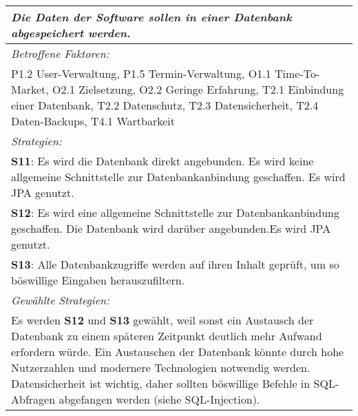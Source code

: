 {\begin{center}
\begin{minipage}{\linewidth}
\begin{tabular}{|>{\centering\arraybackslash}p{15cm}|}
            \label{K4}
            \textit{Die Daten der Software sollen in einer Datenbank abgespeichert werden.}\\ \hline
            \textit{Betroffene Faktoren:} \\ 
	P1.2 User-Verwaltung, P1.5 Termin-Verwaltung, O1.1 Time-To-Market, O2.1 Zielsetzung, O2.2 Geringe Erfahrung, T2.1 Einbindung einer Datenbank, T2.2 Datenschutz, T2.3 Datensicherheit, T2.4 Daten-Backups, T4.1 Wartbarkeit
	\\ \hline
	      \textit{Strategien:} \\ 
	\textbf{S11}: Es wird die Datenbank direkt angebunden. Es wird keine allgemeine Schnittstelle zur Datenbankanbindung geschaffen. Es wird JPA genutzt.\\
	\textbf{S12}: Es wird eine allgemeine Schnittstelle zur Datenbankanbindung geschaffen. Die Datenbank wird darüber angebunden.Es wird JPA genutzt.\\
	\textbf{S13}: Alle Datenbankzugriffe werden auf ihren Inhalt geprüft, um so böswillige Eingaben herauszufiltern.
\\ \hline
	      \textit{Gewählte Strategien:} \\
Es werden \textbf{S12} und \textbf{S13} gewählt, weil sonst ein Austausch der Datenbank zu einem späteren Zeitpunkt deutlich mehr Aufwand erfordern würde. Ein Austauschen der Datenbank könnte durch hohe Nutzerzahlen und modernere Technologien notwendig werden. Datensicherheit ist wichtig, daher sollten böswillige Befehle in SQL-Abfragen abgefangen werden (siehe SQL-Injection).
\\ \hline
        \end{tabular}
\end{minipage}
\end{center}

}
